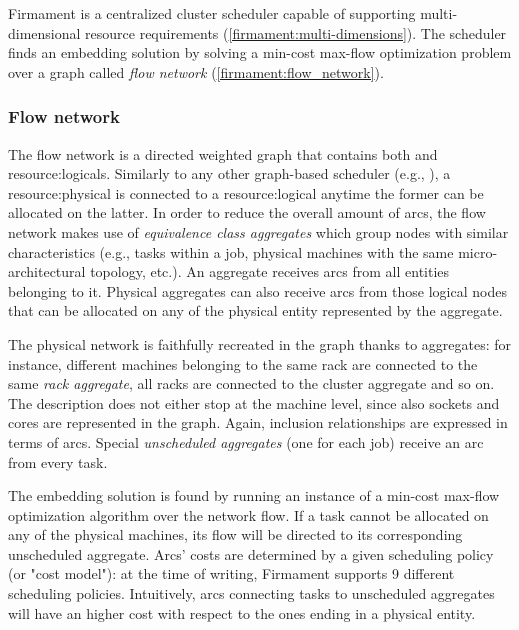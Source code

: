 Firmament \cite{firmament} is a centralized cluster scheduler capable of supporting multi-dimensional resource requirements (\autoref{firmament:multi-dimensions}).
The scheduler finds an embedding solution by solving a min-cost max-flow optimization problem over a graph called \textit{flow network} (\autoref{firmament:flow_network}).

\subsubsection{Flow network} \label{firmament:flow_network}
The flow network is a directed weighted graph that contains both  and \glspl{resource:logical}.
Similarly to any other graph-based scheduler (e.g., \cite{ontackling}), a \gls{resource:physical} is connected to a \gls{resource:logical} anytime the former can be allocated on the latter.
In order to reduce the overall amount of arcs, the flow network makes use of \textit{equivalence class aggregates} which group nodes with similar characteristics (e.g., tasks within a job, physical machines with the same micro-architectural topology, etc.).
An aggregate receives arcs from all entities belonging to it.
Physical aggregates can also receive arcs from those logical nodes that can be allocated on any of the physical entity represented by the aggregate.\par
The physical network is faithfully recreated in the graph thanks to aggregates: for instance, different machines belonging to the same rack are connected to the same \textit{rack aggregate}, all racks are connected to the cluster aggregate and so on.
The description does not either stop at the machine level, since also sockets and cores are represented in the graph.
Again, inclusion relationships are expressed in terms of arcs.
Special \textit{unscheduled aggregates} (one for each job) receive an arc from every task.\par
The embedding solution is found by running an instance of a min-cost max-flow optimization algorithm over the network flow.
If a task cannot be allocated on any of the physical machines, its flow will be directed to its corresponding unscheduled aggregate.
Arcs' costs are determined by a given scheduling policy (or "cost model"): at the time of writing, Firmament \cite{firmament} supports 9 different scheduling policies.
Intuitively, arcs connecting tasks to unscheduled aggregates will have an higher cost with respect to the ones ending in a physical entity.

